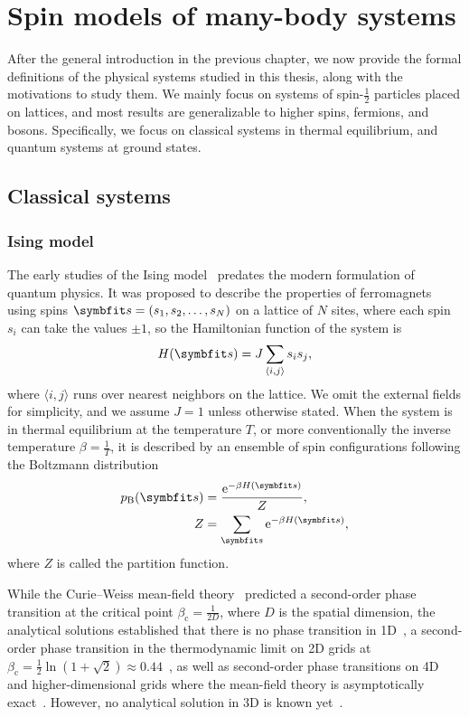 \chapter{Spin models of many-body systems}
\label{ch:systems}

After the general introduction in the previous chapter, we now provide the formal definitions of the physical systems studied in this thesis, along with the motivations to study them. We mainly focus on systems of spin-$\frac{1}{2}$ particles placed on lattices, and most results are generalizable to higher spins, fermions, and bosons. Specifically, we focus on classical systems in thermal equilibrium, and quantum systems at ground states.

\section{Classical systems}
\label{sec:cl-sys}

\subsection{Ising model}
\label{sec:cl-ising}

The early studies of the Ising model~\cite{ising1925contribution, niss2008history} predates the modern formulation of quantum physics. It was proposed to describe the properties of ferromagnets using spins $\vs = (s_1, s_2, \ldots, s_N)$ on a lattice of $N$ sites, where each spin $s_i$ can take the values $\pm 1$, so the Hamiltonian function of the system is
\begin{equation}
H(\vs) = J \sum_{\langle i, j \rangle} s_i s_j,
\label{eq:cl-ising}
\end{equation}
where $\langle i, j \rangle$ runs over nearest neighbors on the lattice. We omit the external fields for simplicity, and we assume $J = 1$ unless otherwise stated. When the system is in thermal equilibrium at the temperature $T$, or more conventionally the inverse temperature $\beta = \frac{1}{T}$, it is described by an ensemble of spin configurations following the Boltzmann distribution
\begin{align}
p_\text{B}(\vs) &= \frac{\rme^{-\beta H(\vs)}}{Z}, \label{eq:boltzmann} \\
Z &= \sum_\vs \rme^{-\beta H(\vs)},
\end{align}
where $Z$ is called the partition function.

While the Curie--Weiss mean-field theory~\cite{weiss1907hypothese} predicted a second-order phase transition at the critical point $\beta_\text{c} = \frac{1}{2 D}$, where $D$ is the spatial dimension, the analytical solutions established that there is no phase transition in 1D~\cite{ising1925contribution}, a second-order phase transition in the thermodynamic limit on 2D grids at $\beta_\text{c} = \frac{1}{2} \ln(1 + \sqrt{2}) \approx 0.44$~\cite{onsager1944crystal}, as well as second-order phase transitions on 4D and higher-dimensional grids where the mean-field theory is asymptotically exact~\cite{als1977mean}. However, no analytical solution in 3D is known yet~\cite{viswanathan2022does}.


